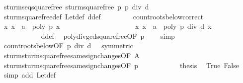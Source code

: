\begin{isabellebody}
\ sturm{\isacharunderscore}seq{\isacharunderscore}squarefree\ {\isachardoublequoteopen}sturm{\isacharunderscore}squarefree{\isacharprime}\ p{\isachardoublequoteclose}\ {\isachardoublequoteopen}p\ div\ d{\isachardoublequoteclose}\isanewline
\ \ \ \ \ \ \ \ \ \ \isamarkupfalse%
\ sturm{\isacharunderscore}squarefree{\isacharprime}{\isacharunderscore}def\ Let{\isacharunderscore}def\ d{\isacharunderscore}def\ \isacommand{{\isachardot}}\isamarkupfalse%
\isanewline
\ \ \ \ \ \ \isamarkupfalse%
\ count{\isacharunderscore}roots{\isacharunderscore}below{\isacharunderscore}correct\isanewline
\ \ \ \ \ \ \isamarkupfalse%
\ \isamarkupfalse%
\ {\isachardoublequoteopen}{\isacharbraceleft}x{\isachardot}\ x\ {\isasymle}\ a\ {\isasymand}\ poly\ p\ x\ {\isacharequal}\ {}{\isacharbraceright}\ {\isacharequal}\ \isanewline
\ \ \ \ \ \ \ \ \ \ \ \ \ \ \ \ \ {\isacharbraceleft}x{\isachardot}\ x\ {\isasymle}\ a\ {\isasymand}\ poly\ {\isacharparenleft}p\ div\ d{\isacharparenright}\ x\ {\isacharequal}\ {}{\isacharbraceright}{\isachardoublequoteclose}\isanewline
\ \ \ \ \ \ \ \ \ \ \isamarkupfalse%
\ d{\isacharunderscore}def\ \isamarkupfalse%
\ poly{\isacharunderscore}div{\isacharunderscore}gcd{\isacharunderscore}squarefree{\isacharparenleft}{}{\isacharparenright}{\isacharbrackleft}OF\ {\isacharbackquoteopen}p\ {\isasymnoteq}\ {}{\isacharbackquoteclose}{\isacharbrackright}\ \isamarkupfalse%
\ simp\isanewline
\ \ \ \ \ \ \isamarkupfalse%
\ \isamarkupfalse%
\ count{\isacharunderscore}roots{\isacharunderscore}below{\isacharbrackleft}OF\ {\isacharbackquoteopen}p\ div\ d\ {\isasymnoteq}\ {}{\isacharbackquoteclose}{\isacharcomma}\ symmetric{\isacharbrackright}\isanewline
\ \ \ \ \ \ \isamarkupfalse%
\ \isamarkupfalse%
\ sturm{\isacharunderscore}sturm{\isacharunderscore}squarefree{\isacharprime}{\isacharunderscore}same{\isacharunderscore}sign{\isacharunderscore}changes{\isacharparenleft}{}{\isacharparenright}{\isacharbrackleft}OF\ A{\isacharbrackright}\isanewline
\ \ \ \ \ \ \isamarkupfalse%
\ \isamarkupfalse%
\ sturm{\isacharunderscore}sturm{\isacharunderscore}squarefree{\isacharprime}{\isacharunderscore}same{\isacharunderscore}sign{\isacharunderscore}changes{\isacharparenleft}{}{\isacharparenright}{\isacharbrackleft}OF\ {\isacharbackquoteopen}p\ {\isasymnoteq}\ {}{\isacharbackquoteclose}{\isacharbrackright}\isanewline
\ \ \ \ \ \ \isamarkupfalse%
\ \isamarkupfalse%
\ {\isacharquery}thesis\ \isamarkupfalse%
\ True\ False\ \isamarkupfalse%
\ {\isacharparenleft}simp\ add{\isacharcolon}\ Let{\isacharunderscore}def{\isacharparenright}\isanewline
\ \ \ \ \isamarkupfalse%
\isanewline
{}\isamarkupfalse%
%
\endisatagproof
{\isafoldproof}%
%
\isadelimproof
\isanewline
%
\endisadelimproof
%
\isadelimtheory
\isanewline
%
\endisadelimtheory
%
\isatagtheory
{}\isamarkupfalse%
%
\endisatagtheory
{\isafoldtheory}%
%
\isadelimtheory
%
\endisadelimtheory
\end{isabellebody}%
